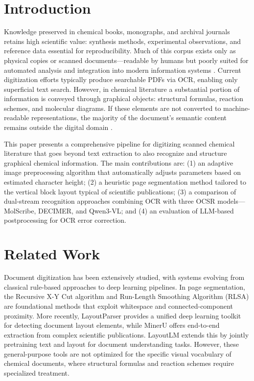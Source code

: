 \documentclass[conference]{IEEEtran}
\begin{document}
\section{Introduction}

Knowledge preserved in chemical books, monographs, and archival journals retains high scientific value: synthesis methods, experimental observations, and reference data essential for reproducibility. Much of this corpus exists only as physical copies or scanned documents---readable by humans but poorly suited for automated analysis and integration into modern information systems \cite{refDavletovEn,refKuchuganovEn}. Current digitization efforts typically produce searchable PDFs via OCR, enabling only superficial text search. However, in chemical literature a substantial portion of information is conveyed through graphical objects: structural formulas, reaction schemes, and molecular diagrams. If these elements are not converted to machine-readable representations, the majority of the document's semantic content remains outside the digital domain \cite{refKuchuganovEn}.

This paper presents a comprehensive pipeline for digitizing scanned chemical literature that goes beyond text extraction to also recognize and structure graphical chemical information. The main contributions are: (1) an adaptive image preprocessing algorithm that automatically adjusts parameters based on estimated character height; (2) a heuristic page segmentation method tailored to the vertical block layout typical of scientific publications; (3) a comparison of dual-stream recognition approaches combining OCR with three OCSR models---MolScribe, DECIMER, and Qwen3-VL; and (4) an evaluation of LLM-based postprocessing for OCR error correction.

\section{Related Work}

Document digitization has been extensively studied, with systems evolving from classical rule-based approaches to deep learning pipelines. In page segmentation, the Recursive X-Y Cut algorithm \cite{refXYCutEn} and Run-Length Smoothing Algorithm (RLSA) \cite{refRLSAEn} are foundational methods that exploit whitespace and connected-component proximity. More recently, LayoutParser \cite{refLayoutParserEn} provides a unified deep learning toolkit for detecting document layout elements, while MinerU \cite{refMinerUEn} offers end-to-end extraction from complex scientific publications. LayoutLM \cite{refLayoutLMEn} extends this by jointly pretraining text and layout for document understanding tasks. However, these general-purpose tools are not optimized for the specific visual vocabulary of chemical documents, where structural formulas and reaction schemes require specialized treatment.
\end{document}
